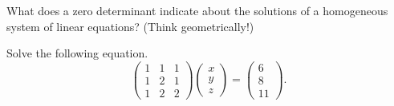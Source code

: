 \documentclass[12pt]{article} %
\begin{document}
\newpage
\begin{problem}
What does a zero determinant indicate about the solutions of a homogeneous system of linear equations? (Think geometrically!)
\end{problem}

\newpage
\begin{problem}
Solve the following equation.
\[
\begin{pmatrix} 1 & 1 & 1 \\ 1 & 2 & 1 \\ 1 & 2 & 2 \end{pmatrix} \begin{pmatrix} x \\ y \\ z \end{pmatrix} = \begin{pmatrix} 6 \\ 8 \\ 11 \end{pmatrix}.
\]
\end{problem}
\end{document}
